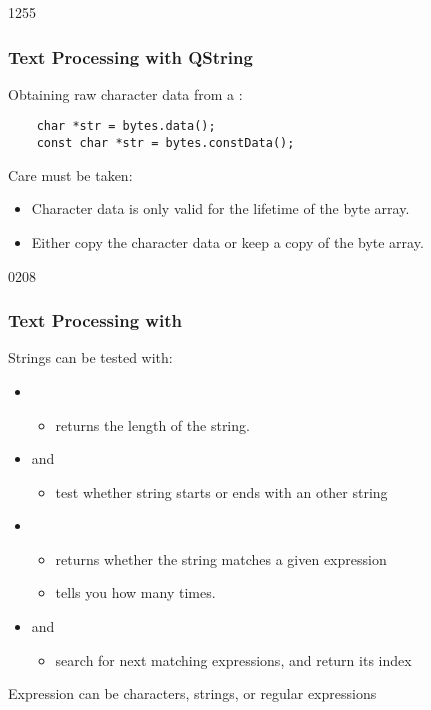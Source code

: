 \begin{slide}[fragile]{1255}\frametitle{Text Processing with QString}
  Obtaining raw character data from a :
  
  \begin{lstlisting}
    char *str = bytes.data();
    const char *str = bytes.constData();
  \end{lstlisting}
  
  Care must be taken:
  \begin{itemize}
  \item Character data is only valid for the lifetime of the byte array.
  \item Either copy the character data or keep a copy of the byte array.
  \end{itemize}
\end{slide}

\begin{slide}{0208}\frametitle{Text Processing with }
    Strings can be tested with:
    \begin{itemize}
      \item {} 
      \begin{itemize}    
        \item returns the length of the string.
      \end{itemize}
      \item {} and  
      \begin{itemize}    
        \item test whether string starts or ends with an other string
      \end{itemize}    
      \item {} 
      \begin{itemize}
        \item returns whether the string matches a given expression
        \item {} tells you how many times.
      \end{itemize}
      \item {} and  
      \begin{itemize}    
        \item search for next matching expressions, and return its index
      \end{itemize}    
    \end{itemize}
    Expression can be characters, strings, or regular expressions
\end{slide}

